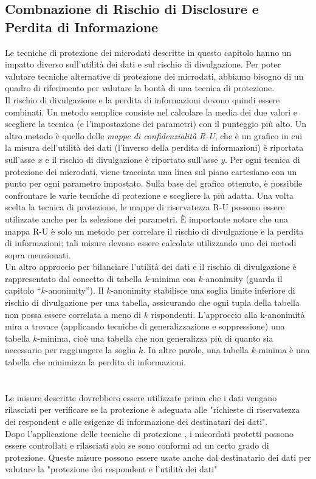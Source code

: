 \subsection{Combnazione di Rischio di Disclosure e Perdita di Informazione}
Le tecniche di protezione dei microdati descritte in questo capitolo hanno un impatto diverso sull'utilità dei dati e sul rischio di divulgazione. Per poter valutare tecniche alternative di protezione dei microdati, abbiamo bisogno di un quadro di riferimento per valutare la bontà di una tecnica di protezione.\\ 
Il rischio di divulgazione e la perdita di informazioni devono quindi essere combinati. Un metodo semplice consiste nel calcolare la media dei due valori e scegliere la tecnica (e l'impostazione dei parametri) con il punteggio più alto. Un altro metodo è quello delle \textit{mappe di confidenzialità R-U}, che è un grafico in cui la misura dell'utilità dei dati (l'inverso della perdita di informazioni) è riportata sull'asse $x$ e il rischio di divulgazione è riportato sull'asse $y$. Per ogni tecnica di protezione dei microdati, viene tracciata una linea sul piano cartesiano con un punto per ogni parametro impostato. Sulla base del grafico ottenuto, è possibile confrontare le varie tecniche di protezione e scegliere la più adatta. Una volta scelta la tecnica di protezione, le mappe di riservatezza R-U possono essere utilizzate anche per la selezione dei parametri. È importante notare che una mappa R-U è solo un metodo per correlare il rischio di divulgazione e la perdita di informazioni; tali misure devono essere calcolate utilizzando uno dei metodi sopra menzionati.\\
Un altro approccio per bilanciare l'utilità dei dati e il rischio di divulgazione è rappresentato dal concetto di tabella $k$-minima con $k$-anonimity (guarda il capitolo “$k$-anonimity”). Il $k$-anonimity stabilisce una soglia limite inferiore di rischio di divulgazione per una tabella, assicurando che ogni tupla della tabella non possa essere correlata a meno di $k$ rispondenti. L'approccio alla k-anonimità mira a trovare (applicando tecniche di generalizzazione e soppressione) una tabella $k$-minima, cioè una tabella che non generalizza più di quanto sia necessario per raggiungere la soglia $k$. In altre parole, una tabella $k$-minima è una tabella che minimizza la perdita di informazioni.\\
\\
\\Le misure descritte dovrebbero essere utilizzate prima che i dati vengano rilasciati per verificare se la protezione è adeguata alle "richieste di riservatezza dei respondent e alle esigenze di informazione dei destinatari dei dati".\\
Dopo l'applicazione delle tecniche di protezione , i micordati protetti possono essere controllati e rilasciati solo se sono conformi ad un certo grado di protezione. Queste misure possono essere usate anche dal destinatario dei dati per valutare la "protezione dei respondent e l'utilità dei dati"

